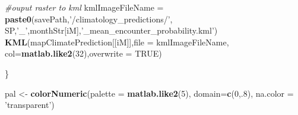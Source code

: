 \documentclass[11pt,]{article}
\newenvironment{Shaded}{\begin{snugshade}}{\end{snugshade}}
\newcommand{\KeywordTok}[1]{\textcolor[rgb]{0.13,0.29,0.53}{\textbf{{#1}}}}
\newcommand{\DataTypeTok}[1]{\textcolor[rgb]{0.13,0.29,0.53}{{#1}}}
\newcommand{\DecValTok}[1]{\textcolor[rgb]{0.00,0.00,0.81}{{#1}}}
\newcommand{\StringTok}[1]{\textcolor[rgb]{0.31,0.60,0.02}{{#1}}}
\newcommand{\CommentTok}[1]{\textcolor[rgb]{0.56,0.35,0.01}{\textit{{#1}}}}
\newcommand{\OtherTok}[1]{\textcolor[rgb]{0.56,0.35,0.01}{{#1}}}
\newcommand{\NormalTok}[1]{{#1}}
\begin{document}
\begin{Shaded}
\begin{Highlighting}[]
  \CommentTok{#ouput raster to kml}
  \NormalTok{kmlImageFileName =}\StringTok{ }\KeywordTok{paste0}\NormalTok{(savePath,}\StringTok{'/climatology_predictions/'}\NormalTok{, SP,}\StringTok{'_'}\NormalTok{,monthStr[iM],}\StringTok{'_mean_encounter_probability.kml'}\NormalTok{)}
  \KeywordTok{KML}\NormalTok{(mapClimatePrediction[[iM]],}\DataTypeTok{file =} \NormalTok{kmlImageFileName, }\DataTypeTok{col=}\KeywordTok{matlab.like2}\NormalTok{(}\DecValTok{32}\NormalTok{),}\DataTypeTok{overwrite =} \OtherTok{TRUE}\NormalTok{)}
  

\NormalTok{\}}
\end{Highlighting}
\end{Shaded}

\begin{Shaded}
\begin{Highlighting}[]
\NormalTok{pal <-}\StringTok{ }\KeywordTok{colorNumeric}\NormalTok{(}\DataTypeTok{palette =} \KeywordTok{matlab.like2}\NormalTok{(}\DecValTok{5}\NormalTok{),}
                    \DataTypeTok{domain=}\KeywordTok{c}\NormalTok{(}\DecValTok{0}\NormalTok{,.}\DecValTok{8}\NormalTok{), }
                    \DataTypeTok{na.color =} \StringTok{'transparent'}\NormalTok{)}


\end{Highlighting}
\end{Shaded}
\end{document}
